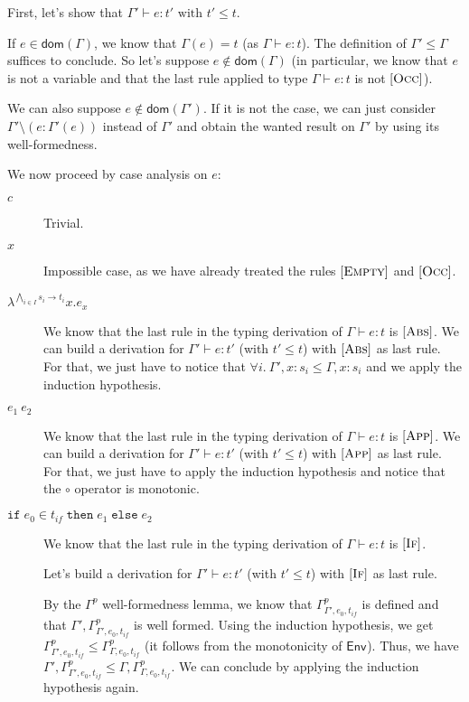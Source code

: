 \documentclass[a4paper]{article}%
\newcommand{\dom}[1]{\textsf{dom}(#1)}
\newcommand{\ite}[4]{\ensuremath{\texttt{if}\;#1\in#2\;\texttt{then}\;#3\;\texttt{else}\;#4}}
\newcommand{\Gp}[2]{\textsf{Env}^{#1}_{#2}}
\theoremstyle{definition}
\newcommand {\Rule}[1] {[\textsc{#1}]}
\begin{document}
        First, let's show that $\Gamma' \vdash e:t' \text{ with } t' \leq t$.
    
        If $e\in\dom\Gamma$, we know that $\Gamma(e)=t$ (as $\Gamma \vdash e:t$). The definition of $\Gamma' \leq \Gamma$ suffices to conclude.
        So let's suppose $e\not\in\dom\Gamma$ (in particular, we know that $e$ is not a variable and that the last rule applied to type $\Gamma \vdash e:t$ is not $\Rule{Occ}$).
    
        We can also suppose $e\not\in\dom{\Gamma'}$. If it is not the case, we can just consider $\Gamma'\setminus(e:\Gamma'(e))$ instead of $\Gamma'$
        and obtain the wanted result on $\Gamma'$ by using its well-formedness.

        We now proceed by case analysis on $e$:
        \begin{description}
          \item[$c$] Trivial.
          \item[$x$] Impossible case, as we have already treated the rules $\Rule{Empty}$ and $\Rule{Occ}$.
          \item[$\lambda^{\bigwedge_{i\in I} s_i \rightarrow t_i}x.e_x$] We know that the last rule in the typing derivation of $\Gamma \vdash e:t$ is $\Rule {Abs}$.
          We can build a derivation for $\Gamma' \vdash e:t'$ (with $t'\leq t$) with $\Rule {Abs}$ as last rule.
          For that, we just have to notice that $\forall i.\ \Gamma',x:s_i \leq \Gamma,x:s_i$ and we apply the induction hypothesis.
          \item[$e_1\ e_2$] We know that the last rule in the typing derivation of $\Gamma \vdash e:t$ is $\Rule {App}$.
          We can build a derivation for $\Gamma' \vdash e:t'$ (with $t'\leq t$) with $\Rule {App}$ as last rule.
          For that, we just have to apply the induction hypothesis and notice that the $\circ$ operator is monotonic.
          \item[$\ite {e_0} {t_{if}} {e_1} {e_2}$]
          We know that the last rule in the typing derivation of $\Gamma \vdash e:t$ is $\Rule {If}$.

          Let's build a derivation for $\Gamma' \vdash e:t'$ (with $t'\leq t$) with $\Rule {If}$ as last rule.

          By the $\Gamma^p$ well-formedness lemma, we know that $\Gamma^p_{\Gamma',e_0,t_{if}}$ is defined and that $\Gamma',\Gamma^p_{\Gamma',e_0,t_{if}}$ is well formed.
          Using the induction hypothesis, we get $\Gamma^p_{\Gamma',e_0,t_{if}} \leq \Gamma^p_{\Gamma,e_0,t_{if}}$ (it follows from the monotonicity of $\Gp {} {}$).
          Thus, we have $\Gamma',\Gamma^p_{\Gamma',e_0,t_{if}} \leq \Gamma,\Gamma^p_{\Gamma,e_0,t_{if}}$.
          We can conclude by applying the induction hypothesis again.\\
        \end{description}
    
\end{document}
